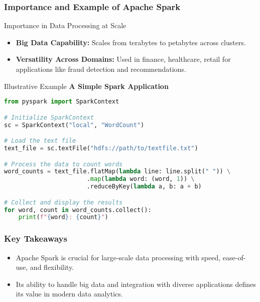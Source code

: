 \documentclass[aspectratio=169]{beamer}
\begin{document}
\begin{frame}[fragile]
    \frametitle{Importance and Example of Apache Spark}
    \begin{block}{Importance in Data Processing at Scale}
        \begin{itemize}
            \item \textbf{Big Data Capability:} Scales from terabytes to petabytes across clusters.
            \item \textbf{Versatility Across Domains:} Used in finance, healthcare, retail for applications like fraud detection and recommendations.
        \end{itemize}
    \end{block}

    \begin{block}{Illustrative Example}
        \textbf{A Simple Spark Application}
        \begin{lstlisting}[language=Python]
from pyspark import SparkContext

# Initialize SparkContext
sc = SparkContext("local", "WordCount")

# Load the text file
text_file = sc.textFile("hdfs://path/to/textfile.txt")

# Process the data to count words
word_counts = text_file.flatMap(lambda line: line.split(" ")) \
                       .map(lambda word: (word, 1)) \
                       .reduceByKey(lambda a, b: a + b)

# Collect and display the results
for word, count in word_counts.collect():
    print(f"{word}: {count}")
        \end{lstlisting}
    \end{block}
\end{frame}

\begin{frame}[fragile]
    \frametitle{Key Takeaways}
    \begin{itemize}
        \item Apache Spark is crucial for large-scale data processing with speed, ease-of-use, and flexibility.
        \item Its ability to handle big data and integration with diverse applications defines its value in modern data analytics.
    \end{itemize}
\end{frame}
\end{document}
